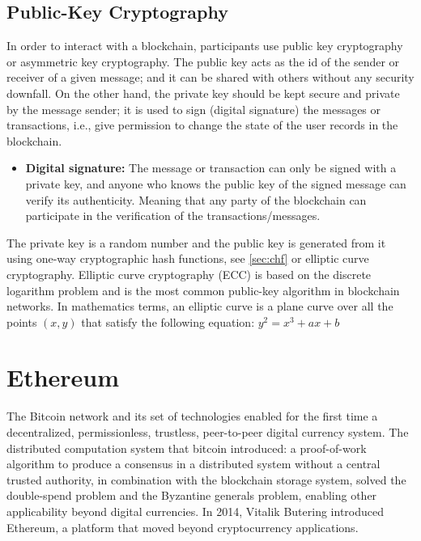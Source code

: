 \documentclass[11pt,a4paper]{report}
\begin{document}
\subsection{Public-Key Cryptography}
In order to interact with a blockchain, participants use public key cryptography or asymmetric key cryptography\cite{book:pkc}. The public key acts as the id of the sender or receiver of a given message; and it can be shared with others without any security downfall. On the other hand, the private key should be kept secure and private by the message sender; it is used to sign (digital signature) the messages or transactions, i.e., give permission to change the state of the user records in the blockchain.
\begin{itemize}
	\item[] \textbf{Digital signature:} The message or transaction can only be signed with a private key, and anyone who knows the public key of the signed message can verify  its authenticity. Meaning that any party of the blockchain can participate in the verification of the transactions/messages.
\end{itemize}
The private key is a random number and the public key is generated from it using one-way cryptographic hash functions, see \ref{sec:chf} or elliptic curve cryptography\cite{book:pkc}\cite{wiki:ecc}. Elliptic curve cryptography (ECC) is based on the discrete logarithm problem and is the most common public-key algorithm in blockchain networks.
In mathematics terms, an elliptic curve is a plane curve over all the points $(x, y)$ that satisfy the following equation:  $ y^2 = x^3 +ax + b $


\section{Ethereum}\label{sec:eth}
The Bitcoin\cite{bitcoin}\cite{book:masteringBTC} network and its set of technologies enabled for the first time a decentralized, permissionless, trustless, peer-to-peer digital currency system. The distributed computation system that bitcoin introduced: a proof-of-work algorithm to produce a consensus in a distributed system without a central trusted authority, in combination with the blockchain storage system, solved the double-spend problem and the Byzantine generals problem, enabling other applicability beyond digital currencies.  In 2014, Vitalik Butering introduced Ethereum\cite{article:eth}, a platform that moved beyond cryptocurrency applications.
\end{document}
